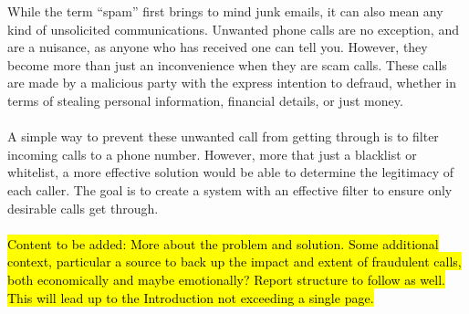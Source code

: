 \documentclass[main.tex]{subfiles}
\begin{document}
\setcounter{page}{1}

While the term ``spam'' first brings to mind junk emails, it can also mean any kind of unsolicited communications. Unwanted phone calls are no exception, and are a nuisance, as anyone who has received one can tell you. However, they become more than just an inconvenience when they are scam calls. These calls are made by a malicious party with the express intention to defraud, whether in terms of stealing personal information, financial details, or just money.
\\\\
A simple way to prevent these unwanted call from getting through is to filter incoming calls to a phone number. However, more that just a blacklist or whitelist, a more effective solution would be able to determine the legitimacy of each caller. The goal is to create a system with an effective filter to ensure only desirable calls get through.
\\\\
\hl{Content to be added: More about the problem and solution. Some additional context, particular a source to back up the impact and extent of fraudulent calls, both economically and maybe emotionally? Report structure to follow as well. This will lead up to the Introduction not exceeding a single page.}
\end{document}
